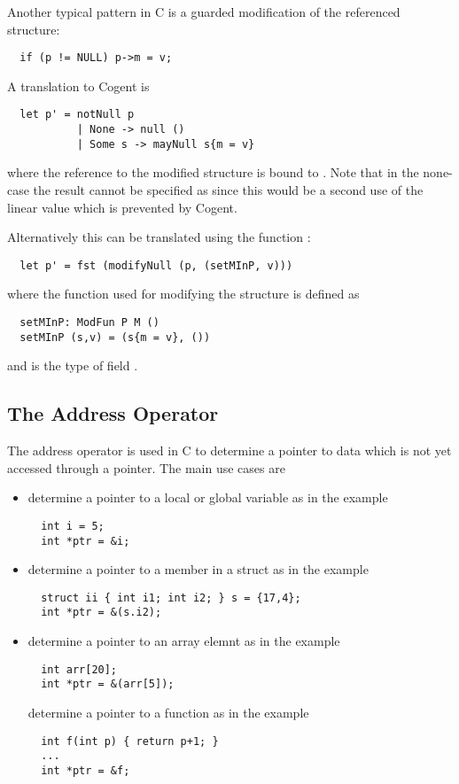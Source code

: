 Another typical pattern in C is a guarded modification of the referenced structure:
\begin{verbatim}
  if (p != NULL) p->m = v;
\end{verbatim}
A translation to Cogent is
\begin{verbatim}
  let p' = notNull p 
           | None -> null ()
           | Some s -> mayNull s{m = v}
\end{verbatim}
where the reference to the modified structure is bound to . Note that in the none-case the result cannot be specified as 
 since this would be a second use of the linear value  which is prevented by Cogent.

Alternatively this can be translated using the function :
\begin{verbatim}
  let p' = fst (modifyNull (p, (setMInP, v)))
\end{verbatim}
where the function used for modifying the structure is defined as
\begin{verbatim}
  setMInP: ModFun P M ()
  setMInP (s,v) = (s{m = v}, ())
\end{verbatim}
and  is the type of field .

\subsection{The Address Operator \code{\&}}
\label{app-trans-addrop}

The address operator \code{\&} is used in C to determine a pointer to data which is not yet accessed through a 
pointer. The main use cases are
\begin{itemize}
\item determine a pointer to a local or global variable as in the example
\begin{verbatim}
  int i = 5;
  int *ptr = &i;
\end{verbatim}

\item determine a pointer to a member in a struct as in the example
\begin{verbatim}
  struct ii { int i1; int i2; } s = {17,4};
  int *ptr = &(s.i2);
\end{verbatim}

\item determine a pointer to an array elemnt as in the example
\begin{verbatim}
  int arr[20];
  int *ptr = &(arr[5]);
\end{verbatim}

determine a pointer to a function as in the example
\begin{verbatim}
  int f(int p) { return p+1; }
  ...
  int *ptr = &f;
\end{verbatim}
\end{itemize}

